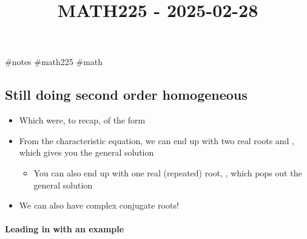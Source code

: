 \documentclass[
]{article}
\title{MATH225 - 2025-02-28}
\author{}
\date{}
\providecommand{\tightlist}{%
  \setlength{\itemsep}{0pt}\setlength{\parskip}{0pt}}
\begin{document}
\maketitle

\#notes \#math225 \#math

\subsection{Still doing second order
homogeneous}\label{still-doing-second-order-homogeneous}

\begin{itemize}
\tightlist
\item
  Which were, to recap, of the form {}
\item
  From the characteristic equation, we can end up with two real roots {}
  and {}, which gives you the general solution {}

  \begin{itemize}
  \tightlist
  \item
    You can also end up with one real (repeated) root, {}, which pops
    out the general solution {}
  \end{itemize}
\item
  We can also have complex conjugate roots!
\end{itemize}

\paragraph{Leading in with an example}\label{leading-in-with-an-example}
\end{document}
